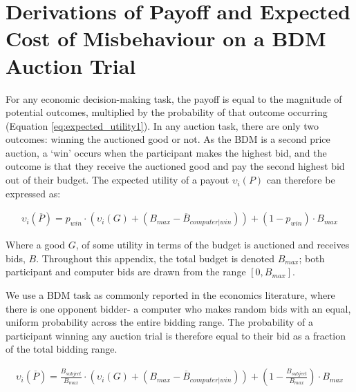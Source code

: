 
\chapter{Derivations of Payoff and Expected Cost of Misbehaviour on a BDM Auction Trial }

\ifpdf
    \graphicspath{{Appendix2.2/Figs/Raster/}{Appendix2.2/Figs/PDF/}{Appendix1/Figs/}}
\else
    \graphicspath{{Appendix2.2/Figs/Vector/}{Appendix2.2/Figs/}}
\fi

For any economic decision-making task, the payoff is equal to the magnitude of potential outcomes, multiplied by the probability of that outcome occurring (Equation \ref{eq:expected_utility1}). In any auction task, there are only two outcomes: winning the auctioned good or not. As the BDM is a second price auction, a ‘win’ occurs when the participant makes the highest bid, and the outcome is that they receive the auctioned good and pay the second highest bid out of their budget. The expected utility of a payout $\upsilon_i (P)$ can therefore be expressed as:

\begin{equation}
\begin{aligned}
\upsilon_i(\overline{P}) = p_{win} \cdot \left(\upsilon_i(G) + (B_{max} - \overline{B}_{computer|win})\right) + (1 - p_{win}) \cdot B_{max}
\end{aligned}
\label{eq:bdm_payoff1}
\end{equation}

Where a good $G$, of some utility in terms of the budget is auctioned and receives bids, $B$. Throughout this appendix, the total budget is denoted $B_{max}$; both participant and computer bids are drawn from the range $[0, B_{max}]$.

We use a BDM task as commonly reported in the economics literature, where there is one opponent bidder- a computer who makes random bids with an equal, uniform probability across the entire bidding range.  The probability of a participant winning any auction trial is therefore equal to their bid as a fraction of the total bidding range.

\begin{equation}
\begin{aligned}
\upsilon_i(\overline{P}) = \frac{B_{subject}}{B_{max}} \cdot \left(\upsilon_i(G) + (B_{max} - \overline{B}_{computer|win})\right) + \left(1 - \frac{B_{subject}}{B_{max}}\right) \cdot B_{max}
\end{aligned}
\label{eq:bdm_payoff2}
\end{equation}


